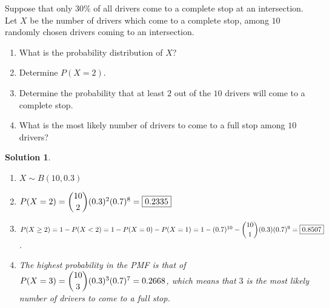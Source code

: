 \documentclass[11pt]{article}
\newtheorem*{solution}{Solution}
\theoremstyle{mystyle}
\begin{document}
\begin{psproblem}{}{}
    Suppose that only $30\%$ of all drivers come to a complete stop at an intersection. Let $X$ be the number of drivers
    which come to a complete stop, among $10$ randomly chosen drivers coming to an intersection.
    \begin{enumerate}[label=\alph*.]
        \item What is the probability distribution of $X$?
        \item Determine $P(X = 2)$.
        \item Determine the probability that at least $2$ out of the $10$ drivers will come to a complete stop.
        \item What is the most likely number of drivers to come to a full stop among $10$ drivers?
    \end{enumerate}
\end{psproblem}

\begin{solution}
    \leavevmode
    \begin{enumerate}[label=\alph*.]
        \item $X \sim B(10, 0.3)$
        \item $P(X = 2) = \dbinom{10}{2} (0.3)^2 (0.7)^8 = \boxed{0.2335}$
        \item $P(X \ge 2) = 1 - P(X < 2) = 1 - P(X = 0) - P(X = 1) = 1 - (0.7)^{10} - \dbinom{10}{1} (0.3)(0.7)^9 = \boxed{0.8507}$.
        \item The highest probability in the PMF is that of $P(X=3)=\dbinom{10}{3} (0.3)^3(0.7)^7 = 0.2668$,
        which means that $\boxed{3}$ is the most likely number of drivers to come to a full stop.
    \end{enumerate}
\end{solution}
\end{document}
